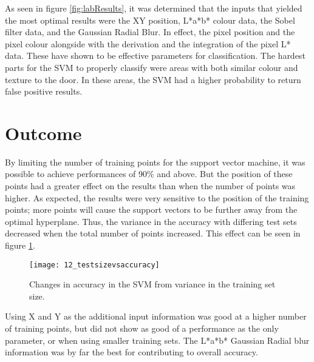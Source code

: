 As seen in figure \ref{fig:labResults}, it was determined that the inputs that yielded the most optimal results were the XY position, L*a*b* colour data, the Sobel filter data, and the Gaussian Radial Blur. In effect, the pixel position and the pixel colour alongside with the derivation and the integration of the pixel L* data. These have shown to be effective parameters for classification. The hardest parts for the SVM to properly classify were areas with both similar colour and texture to the door. In these areas, the SVM had a higher probability to return false positive results.

\section{Outcome}

By limiting the number of training points for the support vector machine, it was possible to achieve performances of 90\% and above. But the position of these points had a greater effect on the results than when the number of points was higher. As expected, the results were very sensitive to the position of the training points; more points will cause the support vectors to be further away from the optimal hyperplane. Thus, the variance in the accuracy with differing test sets decreased when the total number of points increased. This effect can be seen in figure \ref{fig:12_testsizevsaccuracy}.

\begin{figure}[ht]
    \centering
    \texttt{[image: 12\_testsizevsaccuracy]}
    \caption{Changes in accuracy in the SVM from variance in the training set size.}
    \label{fig:12_testsizevsaccuracy}
\end{figure}

Using X and Y as the additional input information was good at a higher number of training points, but did not show as good of a performance as the only parameter, or when using smaller training sets. The L*a*b* Gaussian Radial blur information was by far the best for contributing to overall accuracy. 

